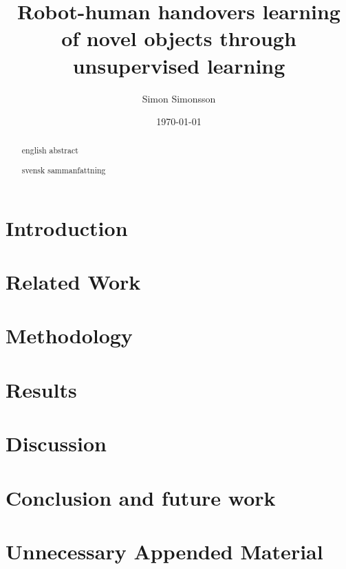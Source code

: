 \documentclass{kththesis}
\title{Robot-human handovers learning of novel objects through unsupervised learning}
\author{Simon Simonsson}
\date{\today}
\begin{document}
\frontmatter

\titlepage

\begin{abstract}
	english abstract
\end{abstract}


\begin{otherlanguage}{swedish}
	\begin{abstract}
		svensk sammanfattning
	\end{abstract}
\end{otherlanguage}


\tableofcontents


\mainmatter


\chapter{Introduction}



\chapter{Related Work}



\chapter{Methodology}



\chapter{Results}


\chapter{Discussion}


\chapter{Conclusion and future work}


\printbibliography[heading=bibintoc] %

\appendix

\chapter{Unnecessary Appended Material}
\end{document}
